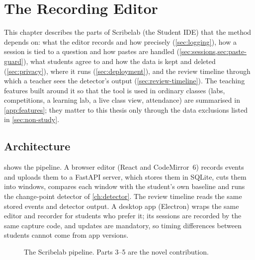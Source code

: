 \chapter{The Recording Editor}
\label{ch:system}

This chapter describes the parts of Scribelab (the Student IDE) that the method
depends on: what the editor records and how precisely
(\cref{sec:logging}), how a session is tied to a question and how pastes are
handled (\cref{sec:sessions,sec:paste-guard}), what students agree to and how
the data is kept and deleted (\cref{sec:privacy}), where it runs
(\cref{sec:deployment}), and the review timeline through which a teacher sees
the detector's output (\cref{sec:review-timeline}). The teaching features built
around it so that the tool is used in ordinary classes (labs, competitions, a
learning lab, a live class view, attendance) are summarised in
\cref{app:features}; they matter to this thesis only through the data
exclusions listed in \cref{sec:non-study}.

\section{Architecture}
\label{sec:architecture}
 shows the pipeline. A browser editor (React and
CodeMirror~6) records events and uploads them to a FastAPI server, which stores
them in SQLite, cuts them into windows, compares each window with the student's
own baseline and runs the change-point detector of \cref{ch:detector}. The
review timeline reads the same stored events and detector output. A desktop
app (Electron) wraps the same editor and recorder for students who prefer it;
its sessions are recorded by the same capture code, and updates are mandatory,
so timing differences between students cannot come from app versions.

\begin{figure}[ht]
  \centering
  \caption{The Scribelab pipeline. Parts 3--5 are the novel contribution.}
  \label{fig:pipeline}
\end{figure}


